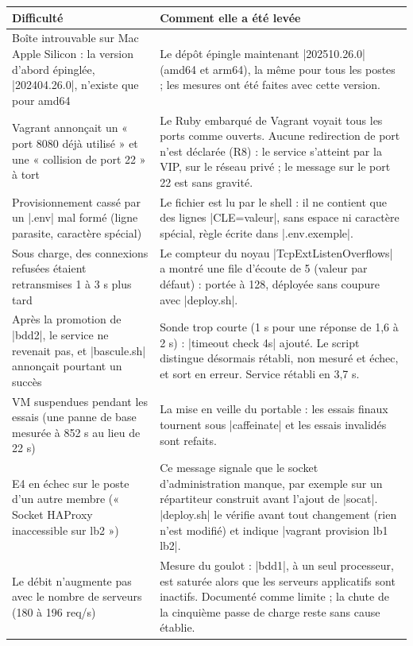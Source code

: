 \documentclass[a4paper,10pt]{article}
\begin{document}
\small
\begin{longtable}{@{}L{4.9cm}L{11.1cm}@{}}
\toprule
\textbf{Difficulté} & \textbf{Comment elle a été levée}\\
\midrule\endhead
Boîte introuvable sur Mac Apple Silicon : la version d'abord épinglée, |202404.26.0|, n'existe que pour amd64 & Le dépôt épingle maintenant |202510.26.0| (amd64 et arm64), la même pour tous les postes ; les mesures ont été faites avec cette version.\\
Vagrant annonçait un « port 8080 déjà utilisé » et une « collision de port 22 » à tort & Le Ruby embarqué de Vagrant voyait tous les ports comme ouverts. Aucune redirection de port n'est déclarée (R8) : le service s'atteint par la VIP, sur le réseau privé ; le message sur le port 22 est sans gravité.\\
Provisionnement cassé par un |.env| mal formé (ligne parasite, caractère spécial) & Le fichier est lu par le shell : il ne contient que des lignes |CLE=valeur|, sans espace ni caractère spécial, règle écrite dans |.env.exemple|.\\
Sous charge, des connexions refusées étaient retransmises 1 à 3 s plus tard & Le compteur du noyau |TcpExtListenOverflows| a montré une file d'écoute de 5 (valeur par défaut) : portée à 128, déployée sans coupure avec |deploy.sh|.\\
Après la promotion de |bdd2|, le service ne revenait pas, et |bascule.sh| annonçait pourtant un succès & Sonde trop courte (1 s pour une réponse de 1,6 à 2 s) : |timeout check 4s| ajouté. Le script distingue désormais rétabli, non mesuré et échec, et sort en erreur. Service rétabli en 3,7 s.\\
VM suspendues pendant les essais (une panne de base mesurée à 852 s au lieu de 22 s) & La mise en veille du portable : les essais finaux tournent sous |caffeinate| et les essais invalidés sont refaits.\\
E4 en échec sur le poste d'un autre membre (« Socket HAProxy inaccessible sur lb2 ») & Ce message signale que le socket d'administration manque, par exemple sur un répartiteur construit avant l'ajout de |socat|. |deploy.sh| le vérifie avant tout changement (rien n'est modifié) et indique |vagrant provision lb1 lb2|.\\
Le débit n'augmente pas avec le nombre de serveurs (180 à 196 req/s) & Mesure du goulot : |bdd1|, à un seul processeur, est saturée alors que les serveurs applicatifs sont inactifs. Documenté comme limite ; la chute de la cinquième passe de charge reste sans cause établie.\\
\bottomrule
\end{longtable}
\normalsize
\end{document}
